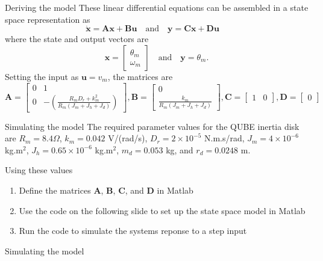 \documentclass[9pt]{beamer-control}
\begin{document}
\begin{frame}{Deriving the model}
These linear differential equations can be assembled in a state space representation as 
\[\dot{\mathbf{x}} =\mathbf{A}\mathbf{x} + \mathbf{B} \mathbf{u} \quad \text{and} \quad \mathbf{y} =\mathbf{C}\mathbf{x} + \mathbf{D} \mathbf{u} \quad \]	
where the state and output vectors are
\[\mathbf{x} = \begin{bmatrix}
\theta_m \\ \omega_m
\end{bmatrix}
\quad \text{and} \quad \mathbf{y} = \theta_m .\]
Setting the input as $\mathbf{u}=v_m$, the matrices are
\[
\mathbf{A}=\begin{bmatrix}
	0 & 1 \\
	0 & -\left(\tfrac{R_m D_r + k_m^2}{R_m(J_m+J_h+J_d)}\right)
\end{bmatrix},
\mathbf{B} = \begin{bmatrix}
	0 \\ \tfrac{k_m}{R_m(J_m+J_h+J_d)}
\end{bmatrix}, 
\mathbf{C} = \begin{bmatrix}
	1 & 0
\end{bmatrix},
\mathbf{D} = \begin{bmatrix}
	0
\end{bmatrix}
\]  
\end{frame}

\begin{frame}{Simulating the model}
The required parameter values for the QUBE inertia disk are $R_m=8.4\Omega$, $k_m=0.042$ V/(rad/s), $D_r=2\times 10^{-5}$ N.m.s/rad, $J_m = 4\times 10^{-6}$ kg.m$^2$, $J_h = 0.65 \times 10^{-6}$ kg.m$^2$, $m_d=0.053$ kg, and $r_d = 0.0248$ m.

Using these values
\begin{enumerate}
	\item Define the matrices $\mathbf{A}$, $\mathbf{B}$, $\mathbf{C}$, and $\mathbf{D}$ in Matlab 
	\item Use the code on the following slide to set up the state space model in Matlab
	\item Run the code to simulate the systems reponse to a step input 
\end{enumerate}

\end{frame}

\begin{frame}{Simulating the model}
\end{frame}
\end{document}
